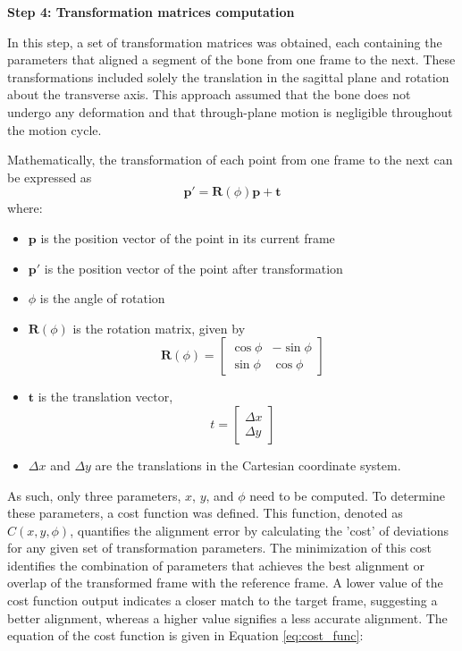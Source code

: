 \documentclass{micro-econ-thesis}
\begin{document}
\textbf{Step 4: Transformation matrices computation}

In this step, a set of transformation matrices was obtained, each containing the parameters that aligned a segment of the bone from one frame to the next. These transformations included solely the translation in the sagittal plane and rotation about the transverse axis. This approach assumed that the bone does not undergo any deformation and that through-plane motion is negligible throughout the motion cycle. 

Mathematically, the transformation of each point from one frame to the next can be expressed as 
\begin{equation}
	\mathbf{p'} = \mathbf{R}(\phi) \mathbf{p} + \mathbf{t}
	\label{eq:rot} 
\end{equation}
where: 
\begin{itemize}
	\item $\mathbf{p}$ is the position vector of the point in its current frame
	\item $\mathbf{p'}$ is the position vector of the point after transformation
	\item $\phi$ is the angle of rotation
	\item $\mathbf{R}(\phi)$  is the rotation matrix, given by 
	 \[
	 \mathbf{R}(\phi) = 
	 \begin{bmatrix}
	 	\cos \phi & -\sin \phi \\
	 	\sin \phi & \cos \phi
	 \end{bmatrix}
	 \]
	 
	 \item $\mathbf{t}$ is the translation vector,
	 	\[
	 	t = \begin{bmatrix}
	 		\Delta x \\
	 		\Delta y
	 	\end{bmatrix}
	 	\]
 	\item $\Delta x$ and $\Delta y$ are the translations in the Cartesian coordinate system. 
\end{itemize}   
As such, only three parameters, $x$, $y$, and $\phi$ need to be computed. To determine these parameters, a cost function was defined. This function, denoted as $C(x,y,\phi)$, quantifies the alignment error by calculating the 'cost' of deviations for any given set of transformation parameters. The minimization of this cost identifies the combination of parameters that achieves the best alignment or overlap of the transformed frame with the reference frame. A lower value of the cost function output indicates a closer match to the target frame, suggesting a better alignment, whereas a higher value signifies a less accurate alignment. The equation of the cost function is given in Equation \ref{eq:cost_func}:  
\end{document}
